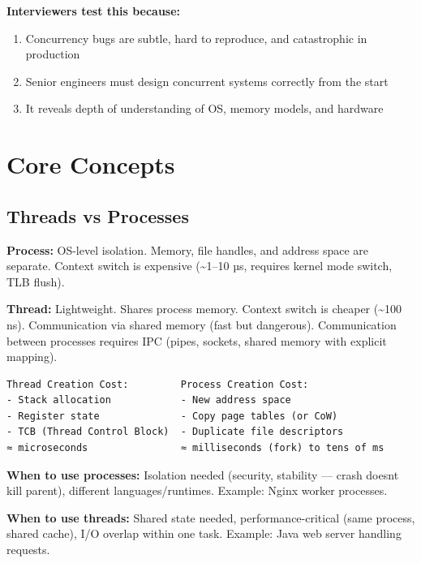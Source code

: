 \documentclass[11pt]{article}
\providecommand{\tightlist}{\setlength{\itemsep}{1pt}\setlength{\parskip}{0pt}}
\begin{document}
\textbf{Interviewers test this because:}

\begin{enumerate}
\def\labelenumi{\arabic{enumi}.}
\tightlist
\item
  Concurrency bugs are subtle, hard to reproduce, and catastrophic in production
\item
  Senior engineers must design concurrent systems correctly from the start
\item
  It reveals depth of understanding of OS, memory models, and hardware
\end{enumerate}

\section{Core Concepts}\label{core-concepts}

\subsection{Threads vs Processes}\label{threads-vs-processes}

\textbf{Process:} OS-level isolation. Memory, file handles, and address space are separate. Context switch is expensive (\textasciitilde1--10 µs, requires kernel mode switch, TLB flush).

\textbf{Thread:} Lightweight. Shares process memory. Context switch is cheaper (\textasciitilde100 ns). Communication via shared memory (fast but dangerous). Communication between processes requires IPC (pipes, sockets, shared memory with explicit mapping).

\setcodelang{}

\begin{verbatim}
Thread Creation Cost:         Process Creation Cost:
- Stack allocation            - New address space
- Register state              - Copy page tables (or CoW)
- TCB (Thread Control Block)  - Duplicate file descriptors
≈ microseconds                ≈ milliseconds (fork) to tens of ms
\end{verbatim}

\textbf{When to use processes:} Isolation needed (security, stability --- crash doesn\textquotesingle t kill parent), different languages/runtimes. Example: Nginx worker processes.

\textbf{When to use threads:} Shared state needed, performance-critical (same process, shared cache), I/O overlap within one task. Example: Java web server handling requests.
\end{document}
